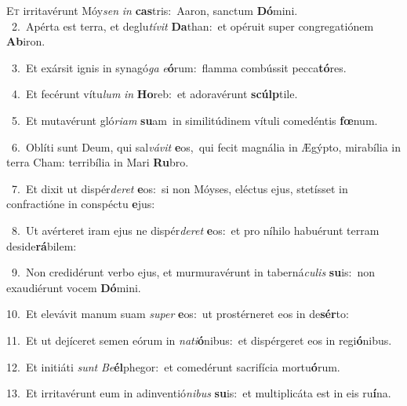 \lettrine{\initial\textcolor{\initialcolor}{E}}{t} irritavérunt Móy\textit{sen} \textit{in} \textbf{cas}\-tris:~\star Aaron, sanctum \textbf{Dó}\-mini.\\
{\numbfont\textcolor{\numbcolor}{~2.}}~Apérta est terra, et deglu\-\textit{tí}\-\textit{vit} \textbf{Da}\-than:~\star et opéruit super congregatiónem \textbf{Ab}\-iron.\par
{\numbfont\textcolor{\numbcolor}{~3.}}~Et exársit ignis in synagó\textit{ga} \textit{e}\-\textbf{ó}rum:~\star flamma combússit pecca\-\textbf{tó}\-res.\par
{\numbfont\textcolor{\numbcolor}{~4.}}~Et fecérunt vítu\textit{lum} \textit{in} \textbf{Ho}\-reb:~\star et adoravérunt \textbf{scúlp}\-tile.\par
{\numbfont\textcolor{\numbcolor}{~5.}}~Et mutavérunt gló\-\textit{ri}\-\textit{am} \textbf{su}\-am~\star in similitúdinem vítuli comedéntis \textbf{fœ}\-num.\par
{\numbfont\textcolor{\numbcolor}{~6.}}~Oblíti sunt Deum, qui sal\-\textit{vá}\-\textit{vit} \textbf{e}\-os,~\star qui fecit magnália in Ægýpto, mirabília in terra Cham: terribília in Mari \textbf{Ru}\-bro.\par
{\numbfont\textcolor{\numbcolor}{~7.}}~Et dixit ut dispér\-\textit{de}\-\textit{ret} \textbf{e}\-os:~\star si non Móyses, eléctus ejus, stetísset in confractióne in conspéctu \textbf{e}\-jus:\par
{\numbfont\textcolor{\numbcolor}{~8.}}~Ut avérteret iram ejus ne dispér\-\textit{de}\-\textit{ret} \textbf{e}\-os:~\star et pro níhilo habuérunt terram deside\-\textbf{rá}\-bilem:\par
{\numbfont\textcolor{\numbcolor}{~9.}}~Non credidérunt verbo ejus, et murmuravérunt in taberná\-\textit{cu}\-\textit{lis} \textbf{su}\-is:~\star non exaudiérunt vocem \textbf{Dó}\-mini.\par
{\numbfont\textcolor{\numbcolor}{10.}}~Et elevávit manum suam \textit{su}\-\textit{per} \textbf{e}\-os:~\star ut prostérneret eos in de\-\textbf{sér}\-to:\par
{\numbfont\textcolor{\numbcolor}{11.}}~Et ut dejíceret semen eórum in \textit{na}\-\textit{ti}\textbf{ó}nibus:~\star et dispérgeret eos in regi\-\textbf{ó}\-nibus.\par
{\numbfont\textcolor{\numbcolor}{12.}}~Et initiáti \textit{sunt} \textit{Be}\-\textbf{él}phegor:~\star et comedérunt sacrifícia mortu\-\textbf{ó}\-rum.\par
{\numbfont\textcolor{\numbcolor}{13.}}~Et irritavérunt eum in adinventió\-\textit{ni}\-\textit{bus} \textbf{su}\-is:~\star et multiplicáta est in eis ru\-\textbf{í}\-na.\par
